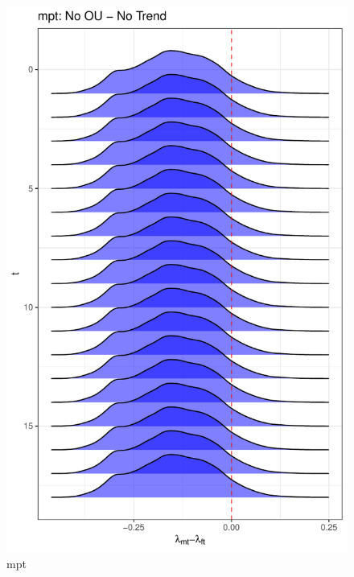 \documentclass[
  12pt,
]{article}
\begin{document}
\begin{figure}

{\centering \includegraphics[width=0.9\linewidth]{../Figures/mpt/lambda_diff} 

}

\caption{mpt}\label{fig:unnamed-chunk-19}
\end{figure}
\end{document}
